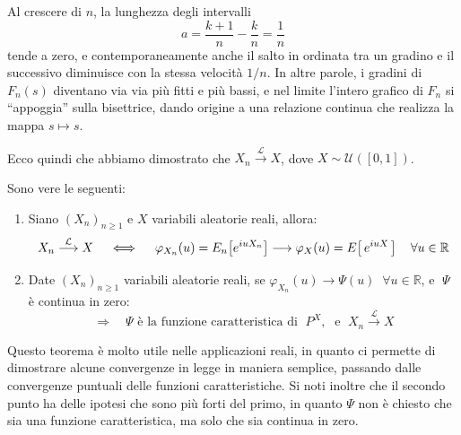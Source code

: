 \begin{esempio}[\faWarning]
\begin{figure}[H]

    \end{figure}

    Al crescere di $n$, la lunghezza degli intervalli
    \[
    a = \frac{k+1}{n} - \frac{k}{n} = \frac{1}{n}
    \]
    tende a zero, e contemporaneamente anche il salto in ordinata tra un gradino e
    il successivo diminuisce con la stessa velocità $1/n$. In altre parole, i gradini
    di $F_n(s)$ diventano via via più fitti e più bassi, e nel limite l’intero grafico
    di $F_n$ si “appoggia” sulla bisettrice, dando origine a una relazione continua
    che realizza la mappa $s \mapsto s$.

    \bigskip 
    \noindent Ecco quindi che abbiamo dimostrato che $X_n \overset{\mathcal{L}}{\longrightarrow} X$, dove $X\sim \mathcal{U}([0, 1])$.
\end{esempio}

\begin{teorema}
    Sono vere le seguenti:
    \begin{enumerate}
        \item Siano $(X_n)_{n\geq1}$ e $X$ variabili aleatorie reali, allora:
        \[X_n \overset{\mathcal{L}}{\longrightarrow} X \quad \iff\quad \varphi_{X_n} (u) = E_n\!\left[e^{iuX_n}\right]\longrightarrow \varphi_X(u) = E\!\left[\,e^{iuX}\,\right] \quad \forall u \in\mathbb{R}\]
        \item Date $(X_n)_{n\geq1}$ variabili aleatorie reali, se $\varphi_{X_n}(u)\longrightarrow\Psi(u)\;\;\forall u\in \mathbb R$\;, e $\;\Psi\;$ è  continua in zero:
        \[\Rightarrow\quad \Psi\text{ è la funzione caratteristica di }\;P^X,\;\text{ e }\;X_n \overset{\mathcal{L}}{\longrightarrow} X\]
    \end{enumerate}
\end{teorema}

Questo teorema è molto utile nelle applicazioni reali, in quanto ci permette di dimostrare alcune convergenze in legge in maniera semplice, passando dalle convergenze puntuali delle funzioni caratteristiche. Si noti inoltre che il secondo punto ha delle ipotesi che sono più forti del primo, in quanto $\Psi$ non è chiesto che sia una funzione caratteristica, ma solo che sia continua in zero.

